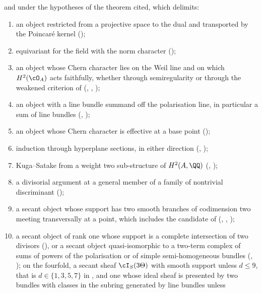 \begin{theorem}[Closure]
\begin{enumerate}[label=\textup{(\roman*)},leftmargin=2.8em,itemsep=4pt]
  and under the hypotheses of the theorem cited, which 
  delimits:
  \begin{enumerate}[label=\textup{(\alph*)},nosep,leftmargin=2.2em]
  \item an object restricted from a projective space to the dual and
    transported by the Poincar\'e kernel (\cite[Theorem~7.3]{paperI});
  \item equivariant for the field with the norm character
    (\cite[Theorem~5.6]{paperI});
  \item an object whose Chern character lies on the Weil line and on which
    $H^{2}(\cO_{A})$ acts faithfully, whether through semiregularity or
    through the weakened criterion of \cite[Question~11.4]{Mar25b}
    (\cite[Theorem~9.7]{paperI}, \cite[Corollary~9.18]{paperI}, \cite[Theorem~9.19]{paperI});
  \item an object with a line bundle summand off the polarisation line, in
    particular a sum of line bundles (\cite[Theorem~9.20]{paperI},
    );
  \item an object whose Chern character is effective at a base point
    ();
  \item induction through hyperplane sections, in either direction
    (\cite[Theorem~10.3]{paperI}, \cite[Theorem~10.8]{paperI});
  \item Kuga--Satake from a weight two sub-structure of $H^{2}(A,\QQ)$
    (\cite[Proposition~11.11]{paperI}, \cite[Corollary~11.12]{paperI});
  \item a divisorial argument at a general member of a family of nontrivial
    discriminant (\cite[Proposition~15.18]{paperI});
  \item a secant object whose support has two smooth branches of codimension
    two meeting transversally at a point, which includes the candidate of
    \cite[Section~12]{Mar25b} (,
    , );
  \item a secant object of rank one whose support is a complete intersection
    of two divisors (), or a secant object quasi-isomorphic to
    a two-term complex of sums of powers of the polarisation or of simple
    semi-homogeneous bundles (, ); on
    the fourfold, a secant sheaf $\cI_{S}(3\Theta)$ with smooth support
    unless $d\le9$, that is $d\in\{1,3,5,7\}$ in , and
    one whose ideal sheaf is presented by two bundles
    with classes in the subring generated by line bundles unless

\end{enumerate}
\end{enumerate}
\end{theorem}
